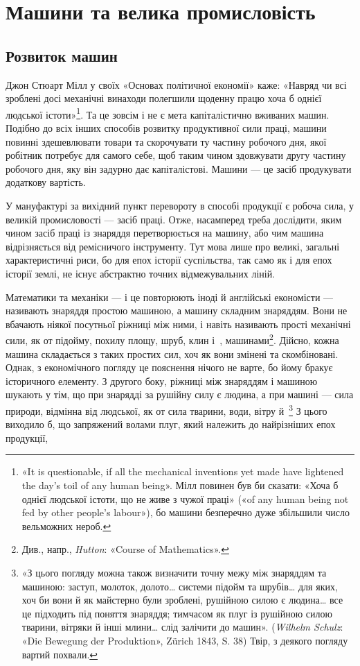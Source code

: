 
\section{Машини та велика промисловість}
\vspace{\bigskipamount}
\subsection{Розвиток машин}

Джон Стюарт Мілл у своїх «Основах політичної економії»
каже: «Навряд чи всі зроблені досі механічні винаходи полегшили
щоденну працю хоча б однієї людської істоти»\footnote{
«It is questionable, if all the mechanical inventions yet made have
lightened the day’s toil of any human being». Мілл повинен був би сказати:
«Хоча б однієї людської істоти, що не живе з чужої праці» («of any human
being not fed by other people’s labour»), бо машини безперечно дуже збільшили
число вельможних нероб.
}. Та це зовсім і не є мета капіталістично вживаних машин. Подібно до
всіх інших способів розвитку продуктивної сили праці, машини
повинні здешевлювати товари та скорочувати ту частину робочого
дня, якої робітник потребує для самого себе, щоб таким
чином здовжувати другу частину робочого дня, яку він задурно
дає капіталістові. Машини — це засіб продукувати додаткову
вартість.

У мануфактурі за вихідний пункт перевороту в способі продукції
є робоча сила, у великій промисловості — засіб праці.
Отже, насамперед треба дослідити, яким чином засіб праці із
знаряддя перетворюється на машину, або чим машина відрізняється
від ремісничого інструменту. Тут мова лише про великі,
загальні характеристичні риси, бо для епох історії суспільства,
так само як і для епох історії землі, не існує абстрактно точних
відмежувальних ліній.

Математики та механіки — і це повторюють іноді й англійські
економісти — називають знаряддя простою машиною, а машину
складним знаряддям. Вони не вбачають ніякої посутньої
ріжниці між ними, і навіть називають прості механічні сили,
як от підойму, похилу площу, шруб, клин і~, машинами\footnote{
Див., напр., \emph{Hutton}: «Course of Mathematics».
}. Дійсно, кожна машина складається з таких простих сил,
хоч як вони змінені та скомбіновані. Однак, з економічного погляду
це пояснення нічого не варте, бо йому бракує історичного
елементу. З другого боку, ріжниці між знаряддям і машиною
шукають у тім, що при знарядді за рушійну силу є людина, а
при машині — сила природи, відмінна від людської, як от сила
тварини, води, вітру й~\footnote{
«З цього погляду можна також визначити точну межу між знаряддям
та машиною: заступ, молоток, долото\dots{} системи підойм та шрубів\dots{}
для яких, хоч би вони й як майстерно були зроблені, рушійною силою є
людина\dots{} все це підходить під поняття знаряддя; тимчасом як плуг із
рушійною силою тварини, вітряки й інші млини\dots{} слід залічити до машин».
(\emph{Wilhelm Schulz}: «Die Bewegung der Produktion», Zürich 1843, S. 38)
Твір, з деякого погляду вартий похвали.
} З цього виходило б, що запряжений
волами плуг, який належить до найрізніших епох продукції,
\parbreak{}  %

